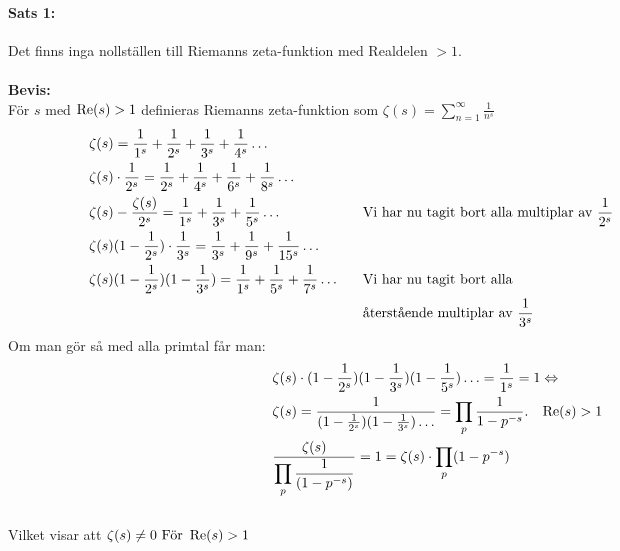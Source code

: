 \documentclass[a4paper,twoside]{article}%
\begin{document}
\paragraph{Sats 1:}
Det finns inga nollställen till Riemanns zeta-funktion med Realdelen $> 1$.\\
\\
{\bf Bevis:} \\
För $s$ med $\operatorname{Re}(s) > 1$ definieras Riemanns zeta-funktion som 
$\zeta(s) = \sum\limits_{n = 1}^\infty \frac {1} {n^s}$ 
\begin{equation}
	\begin{aligned}
		&\zeta(s) = \frac 1 {1^s} + \frac 1 {2^s} + \frac 1 {3^s} + \frac 1 {4^s} \ldots \notag\\
		&\zeta(s) \cdot \frac 1 {2^s} = \frac 1 {2^s} + \frac 1 {4^s} + \frac 1 {6^s} + \frac 1 {8^s} \ldots \\
		&\zeta(s) - \frac {\zeta(s)} {2^s} = \frac 1 {1^s} + \frac 1 {3^s} + \frac 1 {5^s} \ldots &
		\hspace{\width} &\text{Vi har nu tagit bort alla multiplar av } \frac 1 {2^s} \\
		&\zeta(s) (1 - \frac 1 {2^s}) \cdot \frac 1 {3^s} = \frac 1 {3^s} + \frac 1 {9^s} + \frac 1 {15^s} \ldots\\
		&\zeta(s)(1 - \frac 1 {2^s})(1 - \frac 1 {3^s}) = \frac 1 {1^s} + \frac 1 {5^s} + \frac 1 {7^s} \ldots &
		\hspace{\width} &\text{Vi har nu tagit bort alla} \\
		& & \hspace{\width} &\text{återstående multiplar av } \frac 1 {3^s} \\
	\end{aligned}
	\phantom{\hspace{4cm}}
\end{equation}
Om man gör så med alla primtal får man: 
\begin{equation}
	\begin{aligned}
		\notag
		&\zeta(s) \cdot (1 - \frac 1 {2^s})(1 - \frac 1 {3^s})(1 - \frac 1 {5^s}) \ldots = \frac 1 {1^s} = 1 \Leftrightarrow \\  
		&\zeta(s)  = \frac 1 {(1 - \frac 1 {2^s})(1 - \frac 1 {3^s})\ldots} = \prod_p \frac 1 {1 - p^{-s}}.\hspace{3mm} \operatorname{Re}(s) > 1 \\
		&\frac {\zeta(s)} {\displaystyle\prod_p \frac 1 {(1 - p^{-s})}} = 1 = \zeta(s) \cdot \prod_p (1 - p^{-s}) \\
	\end{aligned}
\end{equation}
\\
Vilket visar att $\zeta(s) \ne 0 \text{ För } \operatorname{Re}(s) > 1$
\end{document}

